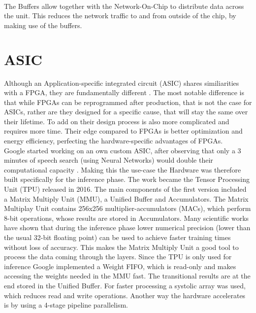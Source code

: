 \documentclass[conference]{IEEEtran}
\begin{document}
\\
The Buffers allow together with the Network-On-Chip to distribute data across the unit. This reduces the network traffic to and from outside of the chip, by making use of the buffers. 
\\

\section{ASIC}
Although an Application-specific integrated circuit (ASIC) shares similiarities with a FPGA, they are fundamentally different \cite{capra2020updated}. The most notable difference is that while FPGAs can be reprogrammed after production, that is not the case for ASICs, rather are they designed for a specific cause, that will stay the same over their lifetime. To add on their design process is also more complicated and requires more time. Their edge compared to FPGAs is better optimization and energy efficiency, perfecting the hardware-specific advantages of FPGAs.
\\
Google started working on an own custom ASIC, after observing that only a 3 minutes of speech search (using Neural Networks) would double their computational capacity \cite{jouppi2017datacenter}. Making this the use-case the Hardware was therefore built specifically for the inference phase. The work became the Tensor Processing Unit (TPU) released in 2016. The main components of the first version included a Matrix Multiply Unit (MMU), a Unified Buffer and Accumulators. The Matrix Multiplay Unit contains 256x256 multiplier-accumulators (MACs), which perform 8-bit operations, whose results are stored in Accumulators. Many scientific works have shown that during the inference phase lower numerical precision (lower than the usual 32-bit floating point) can be used to achieve faster training times without loss of accuracy\cite{rodriguez2018lower}. This makes the Matrix Multiply Unit a good tool to process the data coming through the layers. Since the TPU is only used for inference Google implemented a Weight FIFO, which is read-only and makes accessing the weights needed in the MMU fast. The transitional results are at the end stored in the Unified Buffer. For faster processing a systolic array was used, which reduces read and write operations. 
Another way the hardware accelerates is by using a 4-stage pipeline parallelism.
\end{document}
